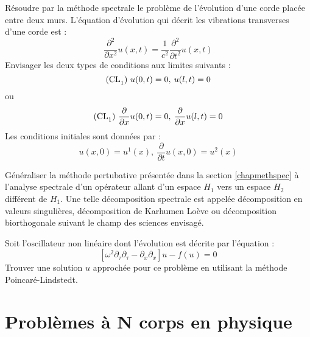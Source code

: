 \documentclass[12pt]{book}
\begin{document}
\begin{exo}\label{exocordespec}
R\'esoudre par la m\'ethode spectrale le probl\`eme de l'\'evolution d'une
corde plac\'ee entre deux murs.
L'\'equation d'\'evolution qui d\'ecrit les
vibrations transverses d'une corde est :
\begin{equation}
\frac{\partial^{2}}{\partial
x^{2}}u(x,t)=\frac{1}{c^2}\frac{\partial^{2}}{\partial t^{2}}u(x,t)
\end{equation}
Envisager les deux types de  conditions aux limites suivants :
\begin{equation}
{\rm (CL}_1{\rm)\ }u(0,t)=0,\:u(l,t)=0
\end{equation}
ou
\begin{equation}
{\rm (CL}_1{\rm)\ }\frac{\partial}{\partial
x}u(0,t)=0,\:\frac{\partial}{\partial x}u(l,t)=0 
\end{equation}
Les conditions initiales sont donn\'ees par :
\begin{equation}
u(x,0)=u^1(x),\:\frac{\partial}{\partial t}u(x,0)=u^2(x)
\end{equation}
\end{exo}


\begin{exo}
G\'en\'eraliser la m\'ethode pertubative pr\'esent\'ee dans la section
\ref{chapmethspec} \`a l'analyse spectrale d'un
op\'erateur allant d'un espace $H_{1}$ vers un espace $H_{2}$ diff\'erent de
$H_1$. Une
telle d\'ecomposition spectrale est appel\'ee d\'ecomposition en valeurs
singuli\`eres, d\'ecomposition de Karhumen Lo\`eve ou d\'ecomposition
biorthogonale suivant le champ des sciences envisag\'e.
\end{exo}


\begin{exo}\label{exopoincalin}
Soit l'oscillateur non lin\'eaire dont l'\'evolution est d\'ecrite par
l'\'equation :
\begin{equation}
\left[\omega^2\partial_{\tau}\partial_{\tau}-\partial_{x}\partial_{x}\right]u-f(u)=0
\end{equation}
Trouver une solution $u$ approch\'ee pour ce probl\`eme en utilisant la
m\'ethode Poincar\'e-Lindstedt.
\end{exo}


\chapter{Probl\`emes \`a N corps en physique}
\end{document}
